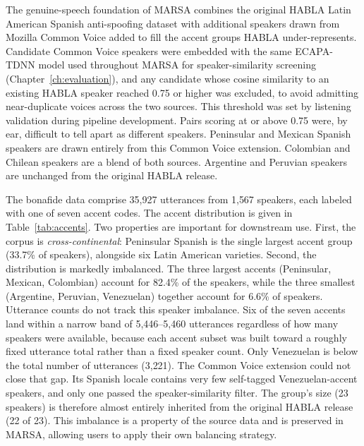 \documentclass[11pt]{report}
\begin{document}
The genuine-speech foundation of MARSA combines the original HABLA Latin
American Spanish anti-spoofing dataset \citep{habla} with additional
speakers drawn from Mozilla Common Voice \citep{commonvoice} added to
fill the accent groups HABLA under-represents. Candidate Common Voice
speakers were embedded with the same ECAPA-TDNN model used throughout
MARSA for speaker-similarity screening \citep{ecapa}
(Chapter~\ref{ch:evaluation}), and any candidate whose cosine similarity
to an existing HABLA speaker reached 0.75 or higher was excluded, to
avoid admitting near-duplicate voices across the two sources. This
threshold was set by listening validation during pipeline development.
Pairs scoring at or above 0.75 were, by ear, difficult to tell apart as
different speakers. Peninsular
and Mexican Spanish speakers are drawn entirely from this Common Voice
extension. Colombian and Chilean speakers are a blend of both sources.
Argentine and Peruvian speakers are unchanged from the original HABLA
release.

The bonafide data comprise 35{,}927 utterances from 1{,}567 speakers, each
labeled with one of seven accent codes. The accent distribution is given
in Table~\ref{tab:accents}. Two properties are important for downstream
use. First, the corpus is \emph{cross-continental}: Peninsular Spanish is
the single largest accent group (33.7\% of speakers), alongside six Latin
American varieties. Second, the distribution is markedly imbalanced. The
three largest accents (Peninsular, Mexican, Colombian) account for 82.4\%
of the speakers, while the three smallest (Argentine, Peruvian,
Venezuelan) together account for 6.6\% of speakers. Utterance counts do
not track this speaker imbalance. Six of the seven accents land within a
narrow band of 5{,}446--5{,}460 utterances regardless of how many speakers
were available, because each accent subset was built toward a roughly
fixed utterance total rather than a fixed speaker count. Only Venezuelan
is below the total number of utterances (3{,}221). The Common Voice
extension could not close that gap. Its Spanish locale contains very few
self-tagged Venezuelan-accent speakers, and only one passed the
speaker-similarity filter. The group's size (23 speakers) is therefore
almost entirely inherited from the original HABLA release (22 of 23).
This imbalance is a property of the source data and is preserved in
MARSA, allowing users to apply their own balancing strategy.
\end{document}
